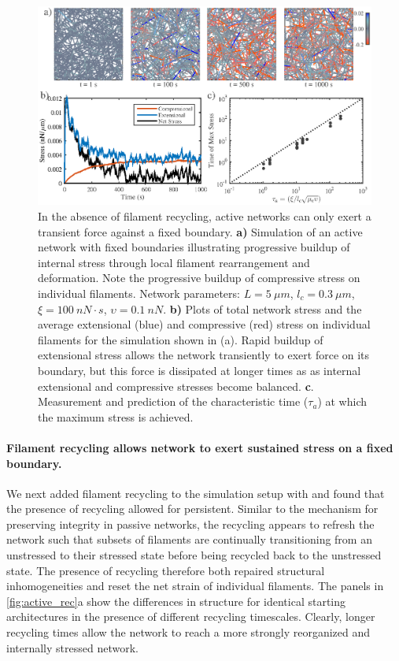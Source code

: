 \documentclass[10pt,letterpaper]{article}
\begin{document}
\begin{figure}[h!]
	\centering
	\includegraphics[width=\hsize]{figures/figure4b}
	\caption{\label{fig:active_str} In the absence of filament recycling, active networks can only exert a transient force against a fixed boundary.  \textbf{a)} Simulation of an active network with fixed boundaries illustrating progressive buildup of internal stress through local filament rearrangement and deformation. Note the progressive buildup of compressive stress on individual filaments. Network parameters: $L=5\: \mu m$, $l_c=0.3\: \mu m$, $\xi=100\: nN\cdot s$, $\upsilon=0.1\: nN$.  \textbf{b)} Plots of total network stress and the average extensional (blue) and compressive (red) stress on individual filaments for the simulation shown in (a). Rapid buildup of extensional stress allows the network transiently to exert force on its boundary, but this force is dissipated at longer times as   as internal extensional and compressive stresses become balanced. \textbf{c}. Measurement and prediction of the characteristic time ($\tau_a$) at which the maximum stress is achieved. }
\end{figure}

\paragraph{Filament recycling allows network to exert sustained stress on a fixed boundary.}
We next added filament recycling to the simulation setup with and found that the presence of recycling allowed for persistent.  Similar to the mechanism for preserving integrity in passive networks, the recycling appears to refresh the network such that subsets of filaments are continually transitioning from an unstressed to their stressed state before being recycled back to the unstressed state.  The presence of recycling therefore both repaired structural inhomogeneities and reset the net strain of individual filaments. The panels in \ref{fig:active_rec}a show the differences in structure for identical starting architectures in the presence of different recycling timescales.  Clearly, longer recycling times allow the network to reach a more strongly reorganized and internally stressed network.
\end{document}
